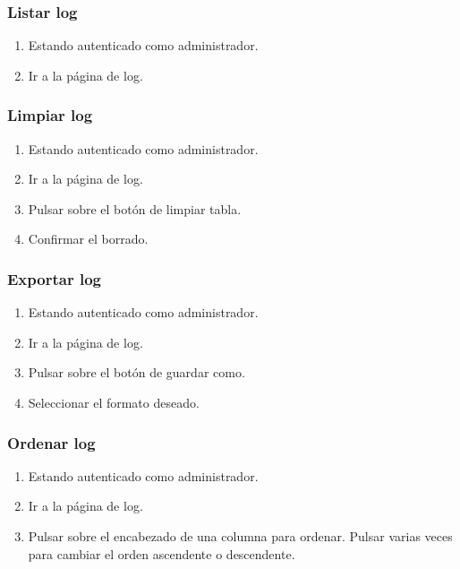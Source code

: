 \subsubsection{Listar log}

\begin{enumerate}
\item Estando autenticado como administrador.
\item Ir a la página de log.
\end{enumerate}

\subsubsection{Limpiar log}

\begin{enumerate}
\item Estando autenticado como administrador.
\item Ir a la página de log.
\item Pulsar sobre el botón de limpiar tabla.
\item Confirmar el borrado.
\end{enumerate}

\subsubsection{Exportar log}

\begin{enumerate}
\item Estando autenticado como administrador.
\item Ir a la página de log.
\item Pulsar sobre el botón de guardar como.
\item Seleccionar el formato deseado.
\end{enumerate}

\subsubsection{Ordenar log}

\begin{enumerate}
\item Estando autenticado como administrador.
\item Ir a la página de log.
\item Pulsar sobre el encabezado de una columna para ordenar. Pulsar varias veces para cambiar el orden ascendente o descendente.
\end{enumerate}

